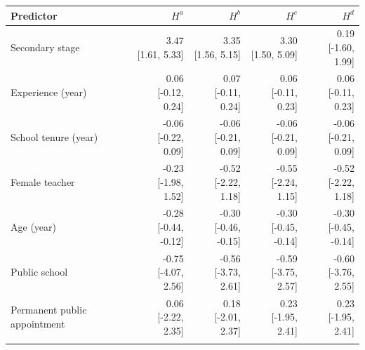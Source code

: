 \begin{tabular}{@{}p{3.6cm}rrrr@{}}
\toprule
Predictor & $H^a$ & $H^b$ & $H^c$ & $H^d$ \\
\midrule
Secondary stage & \shortstack{3.47\\{[1.61, 5.33]}} & \shortstack{3.35\\{[1.56, 5.15]}} & \shortstack{3.30\\{[1.50, 5.09]}} & \shortstack{0.19\\{[-1.60, 1.99]}} \\\addlinespace[2pt]
Experience (year) & \shortstack{0.06\\{[-0.12, 0.24]}} & \shortstack{0.07\\{[-0.11, 0.24]}} & \shortstack{0.06\\{[-0.11, 0.23]}} & \shortstack{0.06\\{[-0.11, 0.23]}} \\\addlinespace[2pt]
School tenure (year) & \shortstack{-0.06\\{[-0.22, 0.09]}} & \shortstack{-0.06\\{[-0.21, 0.09]}} & \shortstack{-0.06\\{[-0.21, 0.09]}} & \shortstack{-0.06\\{[-0.21, 0.09]}} \\\addlinespace[2pt]
Female teacher & \shortstack{-0.23\\{[-1.98, 1.52]}} & \shortstack{-0.52\\{[-2.22, 1.18]}} & \shortstack{-0.55\\{[-2.24, 1.15]}} & \shortstack{-0.52\\{[-2.22, 1.18]}} \\\addlinespace[2pt]
Age (year) & \shortstack{-0.28\\{[-0.44, -0.12]}} & \shortstack{-0.30\\{[-0.46, -0.15]}} & \shortstack{-0.30\\{[-0.45, -0.14]}} & \shortstack{-0.30\\{[-0.45, -0.14]}} \\\addlinespace[2pt]
Public school & \shortstack{-0.75\\{[-4.07, 2.56]}} & \shortstack{-0.56\\{[-3.73, 2.61]}} & \shortstack{-0.59\\{[-3.75, 2.57]}} & \shortstack{-0.60\\{[-3.76, 2.55]}} \\\addlinespace[2pt]
Permanent public appointment & \shortstack{0.06\\{[-2.22, 2.35]}} & \shortstack{0.18\\{[-2.01, 2.37]}} & \shortstack{0.23\\{[-1.95, 2.41]}} & \shortstack{0.23\\{[-1.95, 2.41]}} \\\addlinespace[2pt]

\end{tabular}
